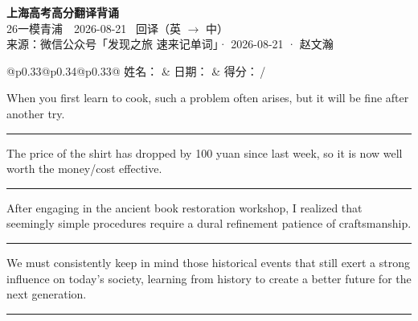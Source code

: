 \documentclass[11pt,a4paper]{article}
\newcommand{\num}[1]{\makebox[1.9em][r]{#1.}\hspace{0.3em}}
\newcommand{\wline}{\noindent\rule{\linewidth}{0.4pt}}
\begin{document}
\pagestyle{plain}
\begin{center}
{\LARGE\bfseries 上海高考高分翻译背诵 }\\[0.25em]
{\large 26一模青浦　2026-08-21 \quad\ 回译（英 $\to$ 中）}\\[0.35em]
{\footnotesize 来源：微信公众号「发现之旅 速来记单词」· 2026-08-21 · 赵文瀚}
\end{center}

\vspace{0.4em}
\noindent\begin{tabular}{@{}p{0.33\textwidth}@{}p{0.34\textwidth}@{}p{0.33\textwidth}@{}}
姓名：\underline{\hspace{2.0cm}} & 日期：\underline{\hspace{2.0cm}} & 得分：\underline{\hspace{1.4cm}}\,/ \\
\end{tabular}

\vspace{0.5em}

\vspace{0.8em}
\num{1}When you first learn to cook, such a problem often arises, but it will be fine after another try.

\vspace{0.25em}

\wline

\num{2}The price of the shirt has dropped by 100 yuan since last week, so it is now well worth the money/cost effective.

\vspace{0.25em}

\wline

\num{3}After engaging in the ancient book restoration workshop, I realized that seemingly simple procedures require a dural refinement patience of craftsmanship.

\vspace{0.25em}

\wline

\num{4}We must consistently keep in mind those historical events that still exert a strong influence on today’s society, learning from history to create a better future for the next generation.

\vspace{0.25em}

\wline
\end{document}
